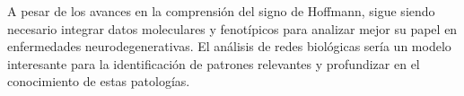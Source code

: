A pesar de los avances en la comprensión del signo de Hoffmann, sigue siendo necesario integrar datos moleculares y fenotípicos para analizar mejor su papel en enfermedades neurodegenerativas. El análisis de redes biológicas sería un modelo interesante para la identificación de patrones relevantes y profundizar en el conocimiento de estas patologías.






